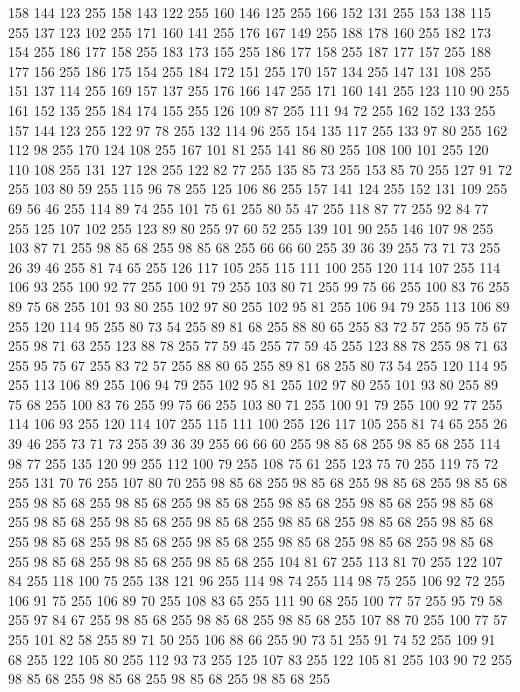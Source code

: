 158 144 123 255 158 143 122 255 160 146 125 255 166 152 131 255 153 138 115 255 137 123 102 255 171 160 141 255 176 167 149 255 188 178 160 255 182 173 154 255 186 177 158 255 183 173 155 255 186 177 158 255 187 177 157 255 188 177 156 255 186 175 154 255 184 172 151 255 170 157 134 255 147 131 108 255 151 137 114 255 169 157 137 255 176 166 147 255 171 160 141 255 123 110 90 255 161 152 135 255 184 174 155 255 126 109 87 255 111 94 72 255 162 152 133 255 157 144 123 255 122 97 78 255 132 114 96 255 154 135 117 255 133 97 80 255 162 112 98 255 170 124 108 255 167 101 81 255 141 86 80 255 108 100 101 255 120 110 108 255 131 127 128 255 122 82 77 255 135 85 73 255 153 85 70 255 127 91 72 255 103 80 59 255 115 96 78 255 125 106 86 255 157 141 124 255 152 131 109 255 69 56 46 255 114 89 74 255 101 75 61 255 80 55 47 255 118 87 77 255 92 84 77 255 125 107 102 255 123 89 80 255 97 60 52 255 139 101 90 255 146 107 98 255 103 87 71 255 98 85 68 255 98 85 68 255
66 66 60 255 39 36 39 255 73 71 73 255 26 39 46 255 81 74 65 255 126 117 105 255 115 111 100 255 120 114 107 255 114 106 93 255 100 92 77 255 100 91 79 255 103 80 71 255 99 75 66 255 100 83 76 255 89 75 68 255 101 93 80 255 102 97 80 255 102 95 81 255 106 94 79 255 113 106 89 255 120 114 95 255 80 73 54 255 89 81 68 255 88 80 65 255 83 72 57 255 95 75 67 255 98 71 63 255 123 88 78 255 77 59 45 255 77 59 45 255 123 88 78 255 98 71 63 255 95 75 67 255 83 72 57 255 88 80 65 255 89 81 68 255 80 73 54 255 120 114 95 255 113 106 89 255 106 94 79 255 102 95 81 255 102 97 80 255 101 93 80 255 89 75 68 255 100 83 76 255 99 75 66 255 103 80 71 255 100 91 79 255 100 92 77 255 114 106 93 255 120 114 107 255 115 111 100 255 126 117 105 255 81 74 65 255 26 39 46 255 73 71 73 255 39 36 39 255 66 66 60 255 98 85 68 255 98 85 68 255 114 98 77 255 135 120 99 255 112 100 79 255 108 75 61 255
123 75 70 255 119 75 72 255 131 70 76 255 107 80 70 255 98 85 68 255 98 85 68 255 98 85 68 255 98 85 68 255 98 85 68 255 98 85 68 255 98 85 68 255 98 85 68 255 98 85 68 255 98 85 68 255 98 85 68 255 98 85 68 255 98 85 68 255 98 85 68 255 98 85 68 255 98 85 68 255 98 85 68 255 98 85 68 255 98 85 68 255 98 85 68 255 98 85 68 255 98 85 68 255 98 85 68 255 98 85 68 255 98 85 68 255 104 81 67 255 113 81 70 255 122 107 84 255 118 100 75 255 138 121 96 255 114 98 74 255 114 98 75 255 106 92 72 255 106 91 75 255 106 89 70 255 108 83 65 255 111 90 68 255 100 77 57 255 95 79 58 255 97 84 67 255 98 85 68 255 98 85 68 255 98 85 68 255 107 88 70 255 100 77 57 255 101 82 58 255 89 71 50 255 106 88 66 255 90 73 51 255 91 74 52 255 109 91 68 255 122 105 80 255 112 93 73 255 125 107 83 255 122 105 81 255 103 90 72 255 98 85 68 255 98 85 68 255 98 85 68 255 98 85 68 255
